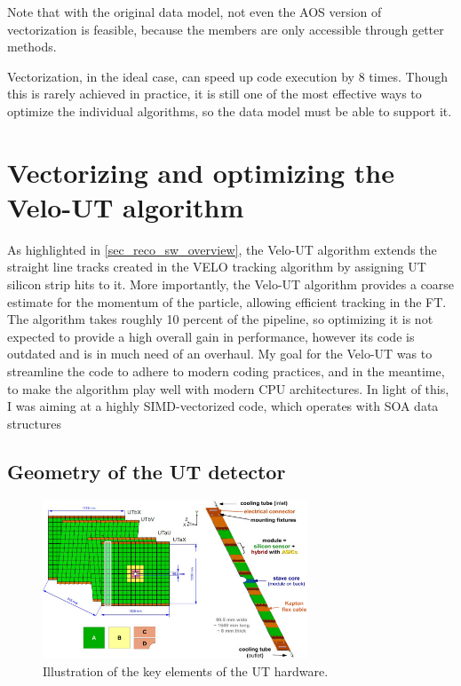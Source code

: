 \documentclass[12pt]{article}
\begin{document}
Note that with the original data model, not even the AOS version of vectorization is feasible, because the members are only accessible through getter methods.

Vectorization, in the ideal case, can speed up code execution by 8 times. Though this is rarely achieved in practice, it is still one of the most effective ways to optimize the individual algorithms, so the data model must be able to support it.


\newpage
\section{Vectorizing and optimizing the Velo-UT algorithm}\label{sec_opt_velout}

As highlighted in \ref{sec_reco_sw_overview}, the Velo-UT algorithm extends the straight line tracks created in the VELO tracking algorithm by assigning UT silicon strip hits to it. More importantly, the Velo-UT algorithm provides a coarse estimate for the momentum of the particle, allowing efficient tracking in the FT.
The algorithm takes roughly 10 percent of the pipeline, so optimizing it is not expected to provide a high overall gain in performance, however its code is outdated and is in much need of an overhaul. My goal for the Velo-UT was to streamline the code to adhere to modern coding practices, and in the meantime, to make the algorithm play well with modern CPU architectures. In light of this, I was aiming at a highly SIMD-vectorized code, which operates with SOA data structures


\subsection{Geometry of the UT detector}

\begin{figure}[H]
	\begin{center}
		\includegraphics[width=0.7\textwidth]{detector_ut_geometry}
	\end{center}
	\caption{Illustration of the key elements of the UT hardware.}
	\label{fig_ut_geometry}
\end{figure}
\end{document}
